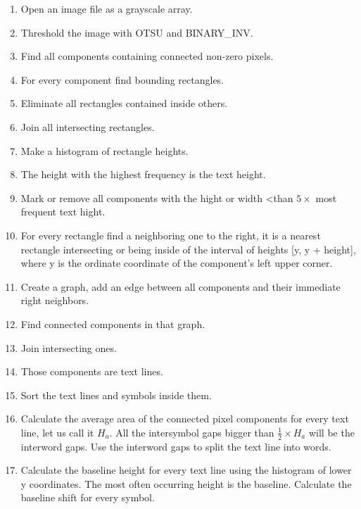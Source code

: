 \documentclass{article}
\begin{document}
\begin{multicols}{2}
\begin{enumerate}
\item Open an image file as a grayscale array.
\item Threshold the image with OTSU and BINARY\_INV.
\item Find all components containing connected non-zero pixels.
\item For every component find bounding rectangles.
\item Eliminate all rectangles contained inside others.
\item Join all intersecting rectangles.
\item Make a histogram of rectangle heights.
\item The height with the highest frequency is the text height.
\item Mark or remove all components with the hight or width \textless than $ 5 \times $ most frequent text hight.
\item For every rectangle find a neighboring one to the right, it is a nearest rectangle  intersecting or being inside of the interval of heights [y, y + height], where y is the ordinate coordinate of the component's left upper corner.
\item Create a graph, add an edge between all components and their immediate right neighbors.
\item Find connected components in that graph.
\item Join intersecting ones.
\item Those components are text lines.
\item Sort the text lines and symbols inside them.
\item Calculate the average area of the connected pixel components for every text line, let us call it $H_a$. All the intersymbol gaps bigger than $\frac{1}{2} \times H_a$ will be the interword gaps. Use the interword gaps to split the text line into words.
\item Calculate the baseline height for every text line using the histogram of lower y coordinates. The most often occurring height is the baseline. Calculate the baseline shift for every symbol.
\end{enumerate}

\end{multicols}
	

	
\end{document}
